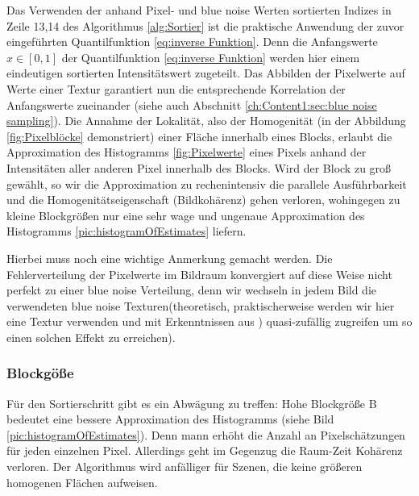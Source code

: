 Das Verwenden der anhand Pixel- und blue noise Werten sortierten Indizes in Zeile 13,14 des Algorithmus \ref{alg:Sortier} ist die praktische Anwendung der zuvor eingeführten 
Quantilfunktion \ref{eq:inverse Funktion}. Denn die Anfangswerte $x \in [0,1]$ der Quantilfunktion \ref{eq:inverse Funktion} werden hier einem eindeutigen sortierten Intensitätswert 
zugeteilt. Das Abbilden der Pixelwerte auf Werte einer  Textur garantiert nun die entsprechende Korrelation 
der Anfangswerte zueinander (siehe auch Abschnitt \ref{ch:Content1:sec:blue noise sampling}).
Die Annahme der Lokalität, also der Homogenität (in der Abbildung \ref{fig:Pixelblöcke} demonstriert) einer Fläche innerhalb eines Blocks, 
erlaubt die Approximation des Histogramms \ref{fig:Pixelwerte} eines Pixels anhand der Intensitäten aller anderen Pixel innerhalb des Blocks.
Wird der Block zu groß gewählt, so wir die Approximation zu rechenintensiv die parallele Ausführbarkeit 
und die  Homogenitätseigenschaft (Bildkohärenz) gehen verloren, wohingegen zu kleine Blockgrößen nur eine sehr wage und ungenaue Approximation des 
Histogramms \ref{pic:histogramOfEstimates} liefern.

\par

Hierbei muss noch eine wichtige Anmerkung gemacht werden. Die Fehlerverteilung der Pixelwerte im Bildraum konvergiert auf diese Weise nicht perfekt zu einer 
blue noise Verteilung, denn wir wechseln in jedem Bild die verwendeten blue noise Texturen(theoretisch, praktischerweise werden wir hier eine
Textur verwenden und mit Erkenntnissen aus ) quasi-zufällig zugreifen um so einen solchen Effekt zu erreichen). 

\label{subsec:Blockgröße}
\subsubsection{Blockgöße}

Für den Sortierschritt gibt es ein Abwägung zu treffen: Hohe Blockgröße B bedeutet eine bessere Approximation 
des Histogramms (siehe Bild \ref{pic:histogramOfEstimates}). Denn mann erhöht die Anzahl an Pixelschätzungen für
jeden einzelnen Pixel. Allerdings geht im Gegenzug die Raum-Zeit Kohärenz verloren. Der Algorithmus wird anfälliger 
für Szenen, die keine größeren homogenen Flächen aufweisen.

